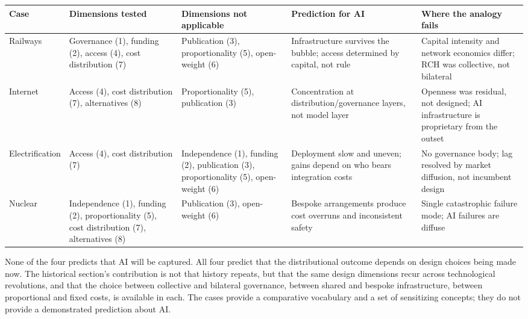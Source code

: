 \begin{table}[H]
\centering
\small
\begin{tabularx}{\textwidth}{@{}l X X X X@{}}
\toprule
Case & Dimensions tested & Dimensions not applicable & Prediction for AI & Where the analogy fails \\
\midrule
Railways & Governance (1), funding (2), access (4), cost distribution (7) & Publication (3), proportionality (5), open-weight (6) & Infrastructure survives the bubble; access determined by capital, not rule & Capital intensity and network economics differ; RCH was collective, not bilateral \\
Internet & Access (4), cost distribution (7), alternatives (8) & Proportionality (5), publication (3) & Concentration at distribution/governance layers, not model layer & Openness was residual, not designed; AI infrastructure is proprietary from the outset \\
Electrification & Access (4), cost distribution (7) & Independence (1), funding (2), publication (3), proportionality (5), open-weight (6) & Deployment slow and uneven; gains depend on who bears integration costs & No governance body; lag resolved by market diffusion, not incumbent design \\
Nuclear & Independence (1), funding (2), proportionality (5), cost distribution (7), alternatives (8) & Publication (3), open-weight (6) & Bespoke arrangements produce cost overruns and inconsistent safety & Single catastrophic failure mode; AI failures are diffuse \\
\bottomrule
\end{tabularx}
\end{table}

None of the four predicts that AI will be captured. All four predict that the distributional outcome depends on design choices being made now. The historical section's contribution is not that history repeats, but that the same design dimensions recur across technological revolutions, and that the choice between collective and bilateral governance, between shared and bespoke infrastructure, between proportional and fixed costs, is available in each. The cases provide a comparative vocabulary and a set of sensitizing concepts; they do not provide a demonstrated prediction about AI.
